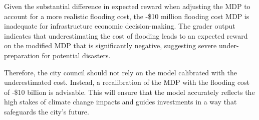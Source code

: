 \begin{answer}
  Given the substantial difference in expected reward when adjusting the MDP to account for a more realistic flooding cost, the -\$10 million flooding cost MDP is inadequate for infrastructure economic decision-making. The grader output indicates that underestimating the cost of flooding leads to an expected reward on the modified MDP that is significantly negative, suggesting severe under-preparation for potential disasters.

  Therefore, the city council should not rely on the model calibrated with the underestimated cost. Instead, a recalibration of the MDP with the flooding cost of -\$10 billion is advisable. This will ensure that the model accurately reflects the high stakes of climate change impacts and guides investments in a way that safeguards the city's future.
  
\end{answer}

\clearpage


